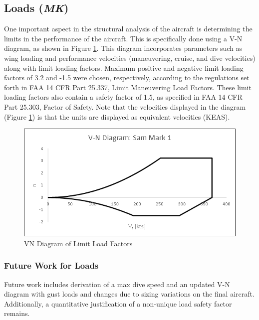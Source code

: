 \subsection{Loads (\textit{MK})}

One important aspect in the structural analysis of the aircraft is determining the limits in the performance of the aircraft. This is specifically done using a V-N diagram, as shown in Figure \ref{figVN}. This diagram incorporates parameters such as wing loading and performance velocities (maneuvering, cruise, and dive velocities) along with limit loading factors. Maximum positive and negative limit loading factors of 3.2 and -1.5 were chosen, respectively, according to the regulations set forth in FAA 14 CFR Part 25.337, Limit Maneuvering Load Factors. These limit loading factors also contain a safety factor of 1.5, as specified in FAA 14 CFR Part 25.303, Factor of Safety. Note that the velocities displayed in the diagram (Figure \ref{figVN}) is that the units are displayed as equivalent velocities (KEAS).

\begin{figure}[H]
    \centering
    \includegraphics[width=\linewidth]{Photos/VN_Diagram_(2-11-20).png}
    \caption{VN Diagram of Limit Load Factors}
    \label{figVN}
\end{figure}

\subsubsection{Future Work for Loads}
Future work includes derivation of a max dive speed and an updated V-N diagram with gust loads and changes due to sizing variations on the final aircraft. Additionally, a quantitative justification of a non-unique load safety factor remains.  

